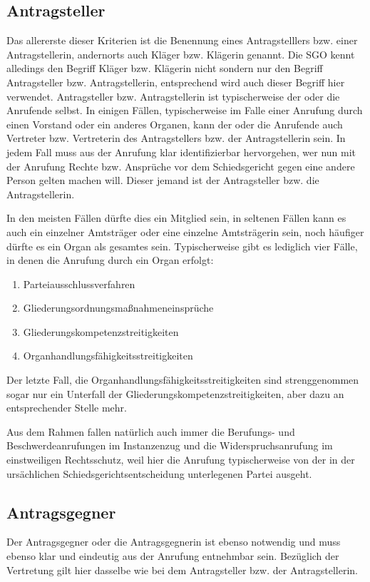\subsection{Antragsteller}
\label{Standardworkflow:Antragsteller}
Das allererste dieser Kriterien ist die Benennung eines  Antragstelllers bzw. einer Antragstellerin, andernorts auch Kläger  bzw. Klägerin genannt.
Die SGO kennt alledings den Begriff Kläger bzw. Klägerin nicht sondern nur den Begriff Antragsteller bzw. Antragstellerin, entsprechend wird auch dieser Begriff hier verwendet.
Antragsteller bzw. Antragstellerin ist typischerweise der oder die Anrufende selbst.
In einigen Fällen, typischerweise im Falle einer Anrufung durch einen Vorstand oder ein anderes Organen, kann der oder die Anrufende auch Vertreter bzw. Vertreterin des Antragstellers bzw. der Antragstellerin sein.
In jedem Fall muss aus der Anrufung klar identifizierbar hervorgehen, wer nun mit der Anrufung Rechte bzw. Ansprüche vor dem Schiedsgericht gegen eine andere Person gelten machen will.
Dieser jemand ist der Antragsteller bzw. die Antragstellerin.

In den meisten Fällen dürfte dies ein Mitglied sein, in seltenen Fällen kann es auch ein einzelner Amtsträger oder eine einzelne Amtsträgerin sein, noch häufiger dürfte es ein Organ als gesamtes sein.
Typischerweise gibt es lediglich vier Fälle, in denen die Anrufung durch ein Organ erfolgt:
\begin{enumerate}[label=\arabic*.)]
\item Parteiausschlussverfahren
\item Gliederungsordnungsmaßnahmeneinsprüche
\item Gliederungskompetenzstreitigkeiten
\item Organhandlungsfähigkeitsstreitigkeiten
\end{enumerate}
Der letzte Fall, die Organhandlungsfähigkeitsstreitigkeiten sind strenggenommen sogar nur ein Unterfall der Gliederungskompetenzstreitigkeiten, aber dazu an entsprechender Stelle mehr.

Aus dem Rahmen fallen natürlich auch immer die Berufungs- und Beschwerdeanrufungen im Instanzenzug und die Widerspruchsanrufung im einstweiligen Rechtsschutz, weil hier die Anrufung typischerweise von der in der ursächlichen Schiedsgerichtsentscheidung unterlegenen Partei ausgeht.

\subsection{Antragsgegner}
\label{Standardworkflow:Antragsgegner}
Der Antragsgegner oder die Antragsgegnerin ist ebenso notwendig und muss ebenso klar und eindeutig aus der Anrufung entnehmbar sein. Bezüglich der Vertretung gilt hier dasselbe wie bei dem  Antragsteller bzw. der Antragstellerin.

